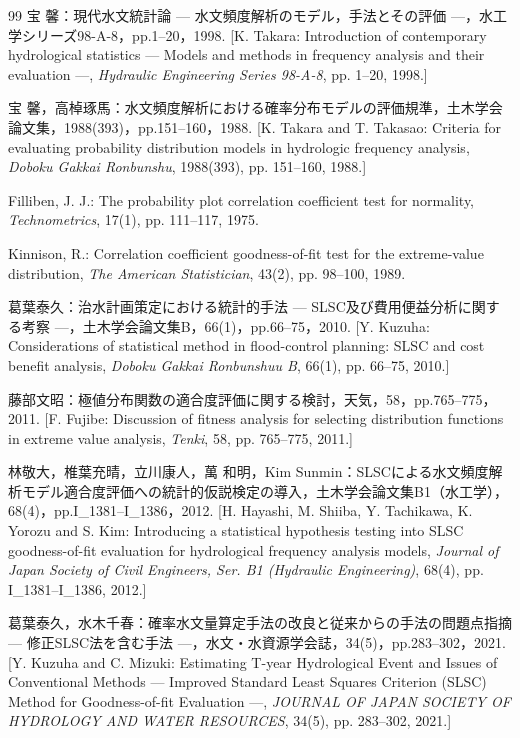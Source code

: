 \documentclass[jscefinal]{jjsce}
\begin{document}
\begin{thebibliography}{99}
宝 馨：現代水文統計論 --- 水文頻度解析のモデル，手法とその評価 ---，水工学シリーズ98-A-8，pp.1--20，1998.
[K. Takara: Introduction of contemporary hydrological statistics --- Models and methods in frequency analysis and their evaluation ---, \textit{Hydraulic Engineering Series 98-A-8}, pp. 1--20, 1998.]

宝 馨，高棹琢馬：水文頻度解析における確率分布モデルの評価規準，土木学会論文集，1988(393)，pp.151--160，1988.
[K. Takara and T. Takasao: Criteria for evaluating probability distribution models in hydrologic frequency analysis, \textit{Doboku Gakkai Ronbunshu}, 1988(393), pp. 151--160, 1988.]

Filliben, J. J.: The probability plot correlation coefficient test for normality, \textit{Technometrics}, 17(1), pp. 111--117, 1975.

Kinnison, R.: Correlation coefficient goodness-of-fit test for the extreme-value distribution, \textit{The American Statistician}, 43(2), pp. 98--100, 1989.

葛葉泰久：治水計画策定における統計的手法 --- SLSC及び費用便益分析に関する考察 ---，土木学会論文集B，66(1)，pp.66--75，2010.
[Y. Kuzuha: Considerations of statistical method in flood-control planning: SLSC and cost benefit analysis, \textit{Doboku Gakkai Ronbunshuu B}, 66(1), pp. 66--75, 2010.]

藤部文昭：極値分布関数の適合度評価に関する検討，天気，58，pp.765--775，2011.
[F. Fujibe: Discussion of fitness analysis for selecting distribution functions in extreme value analysis, \textit{Tenki}, 58, pp. 765--775, 2011.]

林敬大，椎葉充晴，立川康人，萬 和明，Kim Sunmin：SLSCによる水文頻度解析モデル適合度評価への統計的仮説検定の導入，土木学会論文集B1（水工学），68(4)，pp.I\_1381--I\_1386，2012.
[H. Hayashi, M. Shiiba, Y. Tachikawa, K. Yorozu and S. Kim: Introducing a statistical hypothesis testing into SLSC goodness-of-fit evaluation for hydrological frequency analysis models, \textit{Journal of Japan Society of Civil Engineers, Ser. B1 (Hydraulic Engineering)}, 68(4), pp. I\_1381--I\_1386, 2012.]

葛葉泰久，水木千春：確率水文量算定手法の改良と従来からの手法の問題点指摘 --- 修正SLSC法を含む手法 ---，水文・水資源学会誌，34(5)，pp.283--302，2021.
[Y. Kuzuha and C. Mizuki: Estimating T-year Hydrological Event and Issues of Conventional Methods --- Improved Standard Least Squares Criterion (SLSC) Method for Goodness-of-fit Evaluation ---, \textit{JOURNAL OF JAPAN SOCIETY OF HYDROLOGY AND WATER RESOURCES}, 34(5), pp. 283--302, 2021.]


\end{thebibliography}
\end{document}
